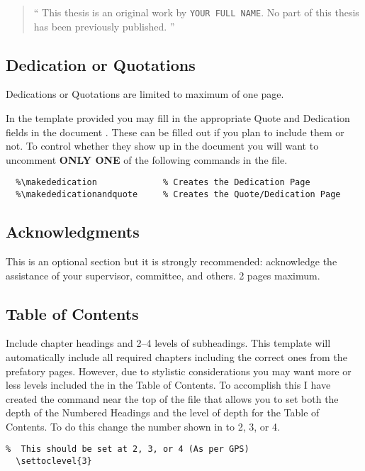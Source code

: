 				\begin{quote}
					\enquote{
						This thesis is an original work by \texttt{YOUR FULL NAME}. 
						No part of this thesis has been previously published. 
					}
				\end{quote}

		\subsection{Dedication or Quotations}
			Dedications or Quotations are limited to maximum of one page.
			
			In the template provided you may fill in the appropriate Quote and Dedication fields in the document .
			These can be filled out if you plan to include them or not.
			To control whether they show up in the document you will want to uncomment \textbf{ONLY ONE} of the following commands in the  file.

			\begin{lstlisting}[float=h,caption=Quote and Dedication Inclusion Options (uncomment only one),label=lst:QuotesAndDedication,style=LaTeXStyle,basicstyle=\scriptsize\ttfamily,]
  %\makequote                  % Creates the Quote Page
  %\makededication             % Creates the Dedication Page
  %\makededicationandquote     % Creates the Quote/Dedication Page
			\end{lstlisting}

		\subsection{Acknowledgments}
			This is an optional section but it is strongly recommended: acknowledge the assistance of your supervisor, committee, and others. 2 pages maximum. 

		\subsection{Table of Contents}
			Include chapter headings and 2--4 levels of subheadings. 
			This template will automatically include all required chapters including the correct ones from the prefatory pages.
			However, due to stylistic considerations you may want more or less levels included the in the Table of Contents.
			To accomplish this I have created the command near the top of the  file that allows you to set both the depth of the Numbered Headings and the level of depth for the Table of Contents.
			To do this change the number shown in  to 2, 3, or 4.
			\begin{lstlisting}[float=h,caption=Set Numbered Heading and ToC Level,label=lst:tocLevels,style=LaTeXStyle,basicstyle=\scriptsize\ttfamily,]
% Option to change the Level of subheading included in the Table of Contents
%  This should be set at 2, 3, or 4 (As per GPS)
  \settoclevel{3}
			\end{lstlisting}

